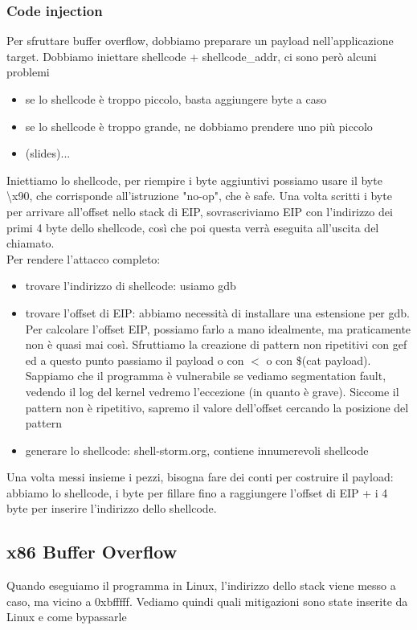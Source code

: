 \documentclass{article}
\begin{document}
\subsubsection{Code injection}
Per sfruttare buffer overflow, dobbiamo preparare un payload nell'applicazione target. Dobbiamo iniettare shellcode + shellcode\_addr, ci sono però alcuni problemi
\begin{itemize}
\item se lo shellcode è troppo piccolo, basta aggiungere byte a caso
\item se lo shellcode è troppo grande, ne dobbiamo prendere uno più piccolo
\item (slides)...
\end{itemize}
Iniettiamo lo shellcode, per riempire i byte aggiuntivi possiamo usare il byte \textbackslash x90, che corrisponde all'istruzione "no-op", che è safe. Una volta scritti i byte per arrivare all'offset nello stack di EIP, sovrascriviamo EIP con l'indirizzo dei primi 4 byte dello shellcode, così che poi questa verrà eseguita all'uscita del chiamato.\\ Per rendere l'attacco completo:
\begin{itemize}
\item trovare l'indirizzo di shellcode: usiamo gdb
\item trovare l'offset di EIP: abbiamo necessità di installare una estensione per gdb. Per calcolare l'offset EIP, possiamo farlo a mano idealmente, ma praticamente non è quasi mai così. Sfruttiamo la creazione di pattern non ripetitivi con gef ed a questo punto passiamo il payload o con $<$ o con \$(cat payload). Sappiamo che il programma è vulnerabile se vediamo segmentation fault, vedendo il log del kernel vedremo l'eccezione (in quanto è grave). Siccome il pattern non è ripetitivo, sapremo il valore dell'offset cercando la posizione del pattern 
\item generare lo shellcode: shell-storm.org, contiene innumerevoli shellcode
\end{itemize}
Una volta messi insieme i pezzi, bisogna fare dei conti per costruire il payload: abbiamo lo shellcode, i byte per fillare fino a raggiungere l'offset di EIP + i 4 byte per inserire l'indirizzo dello shellcode.
\subsection{x86 Buffer Overflow}
Quando eseguiamo il programma in Linux, l'indirizzo dello stack viene messo a caso, ma vicino a 0xbfffff. Vediamo quindi quali mitigazioni sono state inserite da Linux e come bypassarle
\end{document}
